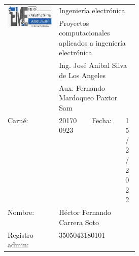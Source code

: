 \documentclass[12pt,letterpaper]{article}
\begin{document}

\begin{title}

\begin{table}[H]
\begin{center}
\begin{tabular}{|c|m{0.20\linewidth}|c|m{0.10\linewidth}|}
\multirow{4}{*}{\includegraphics[scale=0.3]{EIME.png}}                                                         & \multicolumn{3}{l}{Ingeniería electrónica}                                       \\
                                                                                & \multicolumn{3}{l}{Proyectos computacionales aplicados a ingeniería electrónica} \\
                                                                                & \multicolumn{3}{l}{Ing. José Anibal Silva de Los Angeles}                        \\
                                                                                & \multicolumn{3}{l}{Aux. Fernando Mardoqueo Paxtor Sam}                           \\ \hline 
	\multicolumn{1}{|l|}{Carné:} & 201700923 & Fecha: & \multicolumn{1}{l|}{15/2/2022}\\ 
	\hline 
	\multicolumn{1}{|l|}{Nombre:} & \multicolumn{3}{l|}{Héctor Fernando Carrera Soto} \\ 
	\hline 
	\multicolumn{1}{|l|}{Registro admin:} & \multicolumn{3}{l|}{3505043180101} \\ 
	\hline 
	\end{tabular} 
\end{center}
\end{table}

\end{title}

\end{document}
